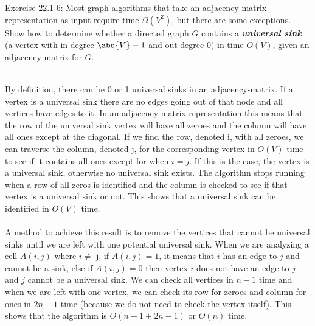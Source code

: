 \documentclass[addpoints,11pt]{exam}
\begin{document}
\begin{questions}
\ifprintanswers
\newpage
\else
\bigskip
\fi


\question[5] Exercise 22.1-6: Most graph algorithms that take an adjacency-matrix representation as input require time $\Omega(V^2)$, but there are some exceptions.  Show how to determine whether a directed graph $G$ contains a \textbf{\textit{universal sink}} (a vertex with in-degree $\abs{V}-1$ and out-degree 0) in time $O(V)$, given an adjacency matrix for $G$.
\begin{solutionorbox} \\
	By definition, there can be 0 or 1 universal sinks in an adjacency-matrix. If a vertex is a universal sink there are no edges going out of that node and all vertices have edges to it. In an adjacency-matrix representation this means that the row of the universal sink vertex will have all zeroes and the column will have all ones except at the diagonal. If we find the row, denoted i, with all zeroes, we can traverse the column, denoted j, for the corresponding vertex in $O(V)$ time to see if it contains all ones except for when $i = j$. If this is the case, the vertex is a universal sink, otherwise no universal sink exists. The algorithm stops running when a row of all zeros is identified and the column is checked to see if that vertex is a universal sink or not. This shows that a universal sink can be identified in $O(V)$ time. \\ \\
	A method to achieve this result is to remove the vertices that cannot be universal sinks until we are left with one potential universal sink. When we are analyzing a cell $A(i,j)$ where $i \neq $ j, if $A(i,j) = 1$, it means that $i$ has an edge to $j$ and cannot be a sink, else if $A(i,j) = 0$ then vertex $i$ does not have an edge to $j$ and $j$ cannot be a universal sink. We can check all vertices in $n - 1$ time and when we are left with one vertex, we can check its row for zeroes and column for ones in $2n - 1$ time (because we do not need to check the vertex itself). This shows that the algorithm is $O(n - 1 + 2n - 1)$ or $O(n)$ time. 
\end{solutionorbox}

\ifprintanswers
\newpage
\else
\bigskip
\fi



\end{questions}
\end{document}

